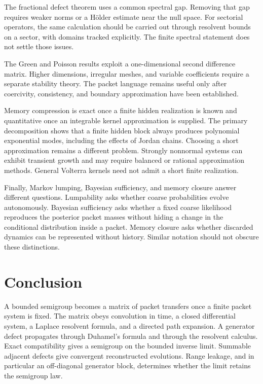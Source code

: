 \documentclass[11pt,letterpaper]{article}
\theoremstyle{plain}
\theoremstyle{plain}
\theoremstyle{plain}
\theoremstyle{definition}
\theoremstyle{definition}
\theoremstyle{definition}
\theoremstyle{definition}
\theoremstyle{definition}
\theoremstyle{remark}
\theoremstyle{remark}
\theoremstyle{remark}
\theoremstyle{remark}
\theoremstyle{remark}
\theoremstyle{remark}
\begin{document}
The fractional defect theorem uses a common spectral gap. Removing that gap requires weaker norms or a Hölder estimate near the null space. For sectorial operators, the same calculation should be carried out through resolvent bounds on a sector, with domains tracked explicitly. The finite spectral statement does not settle those issues.

The Green and Poisson results exploit a one-dimensional second difference matrix. Higher dimensions, irregular meshes, and variable coefficients require a separate stability theory. The packet language remains useful only after coercivity, consistency, and boundary approximation have been established.

Memory compression is exact once a finite hidden realization is known and quantitative once an integrable kernel approximation is supplied. The primary decomposition shows that a finite hidden block always produces polynomial exponential modes, including the effects of Jordan chains. Choosing a short approximation remains a different problem. Strongly nonnormal systems can exhibit transient growth and may require balanced or rational approximation methods. General Volterra kernels need not admit a short finite realization.

Finally, Markov lumping, Bayesian sufficiency, and memory closure answer different questions. Lumpability asks whether coarse probabilities evolve autonomously. Bayesian sufficiency asks whether a fixed coarse likelihood reproduces the posterior packet masses without hiding a change in the conditional distribution inside a packet. Memory closure asks whether discarded dynamics can be represented without history. Similar notation should not obscure these distinctions.

\FloatBarrier
\section{Conclusion}\label{extended:section:19}\label{extended:sec:conclusion}

A bounded semigroup becomes a matrix of packet transfers once a finite packet system is fixed. The matrix obeys convolution in time, a closed differential system, a Laplace resolvent formula, and a directed path expansion. A generator defect propagates through Duhamel's formula and through the resolvent calculus. Exact compatibility gives a semigroup on the bounded inverse limit. Summable adjacent defects give convergent reconstructed evolutions. Range leakage, and in particular an off-diagonal generator block, determines whether the limit retains the semigroup law.
\end{document}
